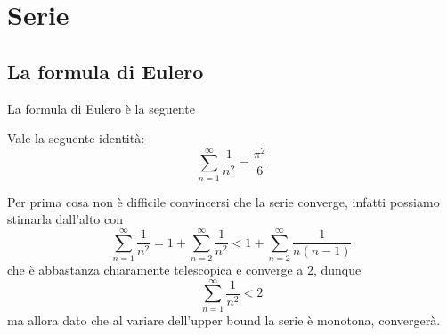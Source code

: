 \documentclass[11pt]{scrartcl}
\begin{document}
  \section{Serie}
  
  \subsection{La formula di Eulero}
  La formula di Eulero è la seguente
  \begin{theorem}[Eulero]
  	Vale la seguente identità:
  	$$\sum_{n=1}^\infty\frac{1}{n^2}=\frac{\pi^2}{6}$$
  \end{theorem}
  Per prima cosa non è difficile convincersi che la serie converge, infatti possiamo stimarla dall'alto con
  $$\sum_{n=1}^\infty\frac{1}{n^2}=1+\sum_{n=2}^\infty \frac{1}{n^2}< 1+\sum_{n=2}^\infty\frac{1}{n(n-1)}$$
  che è abbastanza chiaramente telescopica e converge a $2$, dunque
  $$\sum_{n=1}^\infty\frac{1}{n^2}< 2$$
  ma allora dato che al variare dell'upper bound la serie è monotona, convergerà.
\end{document}
